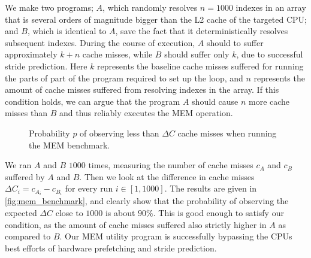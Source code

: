 We make two programs; \(A\), which randomly resolves \(n = 1000\) indexes in an array that is several orders of magnitude bigger than the L2 cache of the targeted CPU; and \(B\), which is identical to \(A\), save the fact that it deterministically resolves subsequent indexes.
During the course of execution, \(A\) should to suffer approximately \(k+n\) cache misses, while \(B\) should suffer only \(k\), due to successful stride prediction.
Here \(k\) represents the baseline cache misses suffered for running the parts of part of the program required to set up the loop, and \(n\) represents the amount of cache misses suffered from resolving indexes in the array.
If this condition holds, we can argue that the program \(A\) should cause \(n\) more cache misses than \(B\) and thus reliably executes the MEM operation. 

\begin{figure}
    \centering
    \caption{Probability \(p\) of observing less than \(\Delta C\) cache misses when running the MEM benchmark.}
    \label{fig:mem_benchmark}
\end{figure}

We ran \(A\) and \(B\) \(1000\) times, measuring the number of cache misses \(c_A\) and \(c_B\) suffered by \(A\) and \(B\).
Then we look at the difference in cache misses \(\Delta C_i = c_{A_i} - c_{B_i}\) for every run \(i \in [1, 1000]\). 
The results are given in \autoref{fig:mem_benchmark}, and clearly show that the probability of observing the expected \(\Delta C\) close to \(1000\) is about \(90\%\).
This is good enough to satisfy our condition, as the amount of cache misses suffered also strictly higher in \(A\) as compared to \(B\).
Our MEM utility program is successfully bypassing the CPUs best efforts of hardware prefetching and stride prediction.


